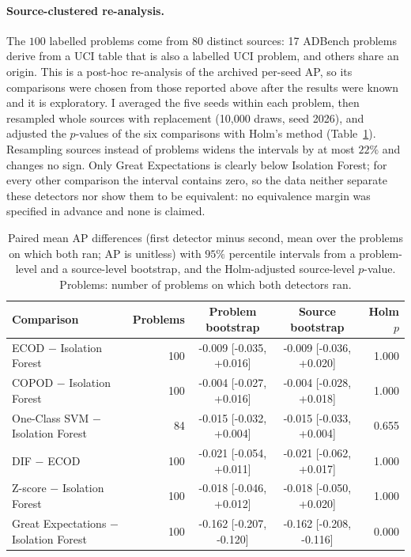 \documentclass[conference]{IEEEtran}
\begin{document}
\paragraph{Source-clustered re-analysis.} The $100$ labelled problems come from 80 distinct
sources: 17 ADBench problems derive from a UCI table that is also a labelled UCI problem, and
others share an origin. This is a post-hoc re-analysis of the archived per-seed AP, so its comparisons were chosen from those
reported above after the results were known and it is exploratory. I averaged the five seeds within each problem,
then resampled whole sources with replacement (10,000 draws, seed 2026), and adjusted the $p$-values of the
six comparisons with Holm's method (Table~\ref{tab:clustered}). Resampling sources instead of problems widens
the intervals by at most $22\%$ and changes no sign. Only Great Expectations is clearly below Isolation Forest;
for every other comparison the interval contains zero, so the data neither separate these detectors nor show them to be
equivalent: no equivalence margin was specified in advance and none is claimed.

\begin{table}[t]
\centering
\caption{Paired mean AP differences (first detector minus second, mean over the problems on which both ran; AP is unitless) with $95\%$ percentile intervals from a problem-level and a source-level bootstrap, and the Holm-adjusted source-level $p$-value. Problems: number of problems on which both detectors ran.}
\label{tab:clustered}
\small
\begin{tabular}{lrccr}
\toprule
Comparison & Problems & Problem bootstrap & Source bootstrap & Holm $p$ \\
\midrule
ECOD $-$ Isolation Forest & 100 & -0.009 [-0.035, +0.016] & -0.009 [-0.036, +0.020] & 1.000 \\
COPOD $-$ Isolation Forest & 100 & -0.004 [-0.027, +0.016] & -0.004 [-0.028, +0.018] & 1.000 \\
One-Class SVM $-$ Isolation Forest & 84 & -0.015 [-0.032, +0.004] & -0.015 [-0.033, +0.004] & 0.655 \\
DIF $-$ ECOD & 100 & -0.021 [-0.054, +0.011] & -0.021 [-0.062, +0.017] & 1.000 \\
Z-score $-$ Isolation Forest & 100 & -0.018 [-0.046, +0.012] & -0.018 [-0.050, +0.020] & 1.000 \\
Great Expectations $-$ Isolation Forest & 100 & -0.162 [-0.207, -0.120] & -0.162 [-0.208, -0.116] & 0.000 \\
\bottomrule
\end{tabular}
\end{table}
\end{document}

